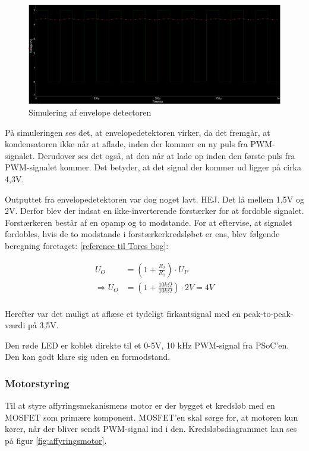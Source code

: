 \begin{figure}[H]
	\centering
	\includegraphics[width=\textwidth]{Afsnit/DesignOgImplementering/images/envelope_detector}
	\caption{Simulering af envelope detectoren}
	\label{fig:envdetsim}
\end{figure}

På simuleringen ses det, at envelopedetektoren virker, da det fremgår, at kondensatoren ikke når at aflade, inden der kommer en ny puls fra PWM-signalet. Derudover ses det også, at den når at lade op inden den første puls fra PWM-signalet kommer. Det betyder, at det signal der kommer ud ligger på cirka 4,3V. 

Outputtet fra envelopedetektoren var dog noget lavt. HEJ. Det lå mellem 1,5V og 2V. Derfor blev der indsat en ikke-inverterende forstærker for at fordoble signalet. Forstærkeren består af en opamp og to modstande. For at eftervise, at signalet fordobles, hvis de to modstande i forstærkerkredsløbet er ens, blev følgende beregning foretaget: \ref{reference til Tores bog}: 

\begin{align}
U_{O}&=(1+\frac{R_{2}}{R_{1}}) \cdot U_{P} \\ 	\nonumber
\Rightarrow U_{O}&=(1+\frac{10k\Omega}{10k\Omega}) \cdot 2V = 4V \\	\nonumber 
\end{align}

Herefter var det muligt at aflæse et tydeligt firkantsignal med en peak-to-peak-værdi på 3,5V. 

Den røde LED er koblet direkte til et 0-5V, 10 kHz PWM-signal fra PSoC'en. Den kan godt klare sig uden en formodstand. 

\subsubsection{Motorstyring}
Til at styre affyringsmekanismens motor er der bygget et kredsløb med en MOSFET som primære komponent. MOSFET'en skal sørge for, at motoren kun kører, når der bliver sendt PWM-signal ind i den. Kredsløbsdiagrammet kan ses på figur \ref{fig:affyringsmotor}. 

